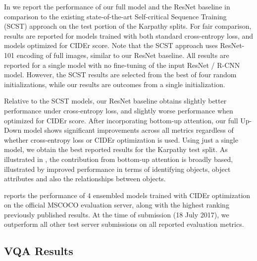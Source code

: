 \documentclass[10pt,twocolumn,letterpaper]{article}
\begin{document}
In  we report the performance of our full model and the ResNet baseline in comparison to the existing state-of-the-art Self-critical Sequence Training~\cite{scst2016} (SCST) approach on the test portion of the Karpathy splits. For fair comparison, results are reported for models trained with both standard cross-entropy loss, and models optimized for CIDEr score. Note that the SCST approach uses ResNet-101 encoding of full images, similar to our ResNet baseline. All results are reported for a single model with no fine-tuning of the input ResNet / R-CNN model. However, the SCST results are selected from the best of four random initializations, while our results are outcomes from a single initialization.

Relative to the SCST models, our ResNet baseline obtains slightly better performance under cross-entropy loss, and slightly worse performance when optimized for CIDEr score. After incorporating bottom-up attention, our full Up-Down model shows significant improvements across all metrics regardless of whether cross-entropy loss or CIDEr optimization is used. Using just a single model, we obtain the best reported results for the Karpathy test split. As illustrated in , the contribution from bottom-up attention is broadly based, illustrated by improved performance in terms of identifying objects, object attributes and also the relationships between objects.

 reports the performance of 4 ensembled models trained with CIDEr optimization on the official MSCOCO evaluation server, along with the highest ranking previously published results. At the time of submission (18 July 2017), we outperform all other test server submissions on all reported evaluation metrics.




\subsection{VQA Results}
\end{document}
